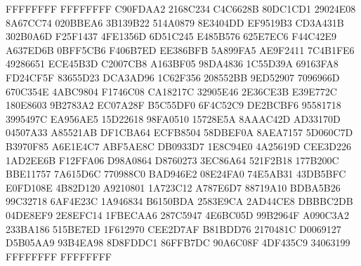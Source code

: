\documentclass[a4paper,titlepage]{article}
\begin{document}

\begin{tt}
        FFFFFFFF FFFFFFFF C90FDAA2 2168C234 C4C6628B 80DC1CD1
        29024E08 8A67CC74 020BBEA6 3B139B22 514A0879 8E3404DD
        EF9519B3 CD3A431B 302B0A6D F25F1437 4FE1356D 6D51C245
        E485B576 625E7EC6 F44C42E9 A637ED6B 0BFF5CB6 F406B7ED
        EE386BFB 5A899FA5 AE9F2411 7C4B1FE6 49286651 ECE45B3D
        C2007CB8 A163BF05 98DA4836 1C55D39A 69163FA8 FD24CF5F
        83655D23 DCA3AD96 1C62F356 208552BB 9ED52907 7096966D
        670C354E 4ABC9804 F1746C08 CA18217C 32905E46 2E36CE3B
        E39E772C 180E8603 9B2783A2 EC07A28F B5C55DF0 6F4C52C9
        DE2BCBF6 95581718 3995497C EA956AE5 15D22618 98FA0510
        15728E5A 8AAAC42D AD33170D 04507A33 A85521AB DF1CBA64
        ECFB8504 58DBEF0A 8AEA7157 5D060C7D B3970F85 A6E1E4C7
        ABF5AE8C DB0933D7 1E8C94E0 4A25619D CEE3D226 1AD2EE6B
        F12FFA06 D98A0864 D8760273 3EC86A64 521F2B18 177B200C
        BBE11757 7A615D6C 770988C0 BAD946E2 08E24FA0 74E5AB31
        43DB5BFC E0FD108E 4B82D120 A9210801 1A723C12 A787E6D7
        88719A10 BDBA5B26 99C32718 6AF4E23C 1A946834 B6150BDA
        2583E9CA 2AD44CE8 DBBBC2DB 04DE8EF9 2E8EFC14 1FBECAA6
        287C5947 4E6BC05D 99B2964F A090C3A2 233BA186 515BE7ED
        1F612970 CEE2D7AF B81BDD76 2170481C D0069127 D5B05AA9
        93B4EA98 8D8FDDC1 86FFB7DC 90A6C08F 4DF435C9 34063199
        FFFFFFFF FFFFFFFF
\end{tt}

\end{document}
